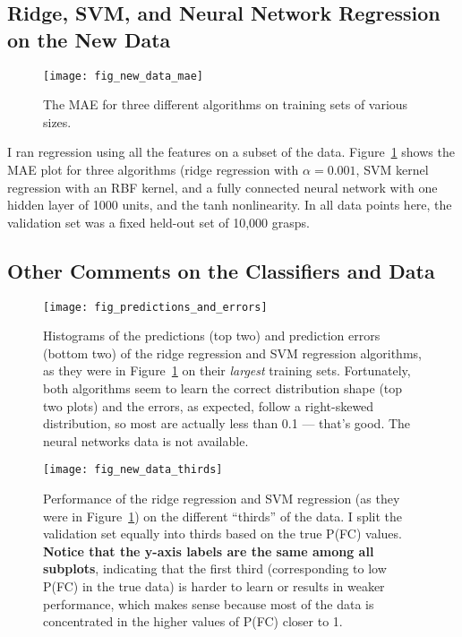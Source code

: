 \documentclass[a4paper, 11pt]{article}
\begin{document}
\subsection{Ridge, SVM, and Neural Network Regression on the New Data}

\begin{figure}[t]
  \centering
  \texttt{[image: fig\_new\_data\_mae]}
  \caption{The MAE for three different algorithms on training sets of various sizes.}
  \label{fig:new_data_mae}
\end{figure}

I ran regression using all the features on a subset of the data. Figure~\ref{fig:new_data_mae} shows
the MAE plot for three algorithms (ridge regression with $\alpha = 0.001$, SVM kernel regression
with an RBF kernel, and a fully connected neural network with one hidden layer of 1000 units, and
the tanh nonlinearity. In all data points here, the validation set was a fixed held-out set of
10,000 grasps.

\subsection{Other Comments on the Classifiers and Data}

\begin{figure}[t]
  \centering
  \texttt{[image: fig\_predictions\_and\_errors]}
  \caption{Histograms of the predictions (top two) and prediction errors (bottom two) of the ridge
  regression and SVM regression algorithms, as they were in Figure~\ref{fig:new_data_mae} on their
  \emph{largest} training sets. Fortunately, both algorithms seem to learn the correct distribution
  shape (top two plots) and the errors, as expected, follow a right-skewed distribution, so most are
  actually less than 0.1 --- that's good. The neural networks data is not available.}
  \label{fig:predictions_and_errors}
\end{figure}

\begin{figure}[t]
  \centering
  \texttt{[image: fig\_new\_data\_thirds]}
  \caption{Performance of the ridge regression and SVM regression (as they were in
  Figure~\ref{fig:new_data_mae}) on the different ``thirds'' of the data. I split the validation set
  equally into thirds based on the true P(FC) values. \textbf{Notice that the y-axis labels are the
  same among all subplots}, indicating that the first third (corresponding to low P(FC) in the true
  data) is harder to learn or results in weaker performance, which makes sense because most of the
  data is concentrated in the higher values of P(FC) closer to 1.}
  \label{fig:new_data_thirds}
\end{figure}
\end{document}
